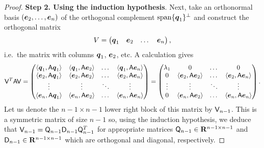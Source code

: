 \begin{proof}
            \vspace{.3cm}
            \textbf{Step 2. Using the induction hypothesis}.
            Next,
            take an orthonormal basis $(\mathbf{\boldsymbol{e}}_2, \dotsc, \mathbf{\boldsymbol{e}}_n)$ of the orthogonal complement $\operatorname{span}\{\mathbf{\boldsymbol{q}}_1\}^\perp$
            and construct the orthogonal matrix
            \[
                V = \begin{pmatrix} \mathbf{\boldsymbol{q}}_1 & \mathbf{\boldsymbol{e}}_2 & \dots & \mathbf{\boldsymbol{e}}_n \end{pmatrix},
            \]
            i.e.\ the matrix with columns $\mathbf{\boldsymbol{q}}_1$, $\mathbf{\boldsymbol{e}}_2$, etc.
            A calculation gives
            \[
                \mathsf V^T \mathsf A \mathsf V =
                \begin{pmatrix}
                    \langle\mathbf{\boldsymbol{q}}_1, \mathsf A \mathbf{\boldsymbol{q}}_1\rangle & \langle\mathbf{\boldsymbol{q}}_1, \mathsf A \mathbf{\boldsymbol{e}}_2\rangle & \dots & \langle\mathbf{\boldsymbol{q}}_1, \mathsf A \mathbf{\boldsymbol{e}}_n\rangle \\
                    \langle\mathbf{\boldsymbol{e}}_2, \mathsf A \mathbf{\boldsymbol{q}}_1\rangle & \langle\mathbf{\boldsymbol{e}}_2, \mathsf A \mathbf{\boldsymbol{e}}_2\rangle & \dots & \langle\mathbf{\boldsymbol{e}}_2, \mathsf A \mathbf{\boldsymbol{e}}_n\rangle \\
                    \vdots & \vdots & \ddots & \vdots \\
                    \langle\mathbf{\boldsymbol{e}}_n, \mathsf A \mathbf{\boldsymbol{q}}_1\rangle & \langle\mathbf{\boldsymbol{e}}_n, \mathsf A \mathbf{\boldsymbol{e}}_2\rangle & \dots & \langle\mathbf{\boldsymbol{e}}_n, \mathsf A \mathbf{\boldsymbol{e}}_n\rangle
                \end{pmatrix}
                =
                \begin{pmatrix}
                    \lambda_1 & 0 & \dots & 0 \\
                    0 & \langle\mathbf{\boldsymbol{e}}_2, \mathsf A \mathbf{\boldsymbol{e}}_2\rangle & \dots & \langle\mathbf{\boldsymbol{e}}_2, \mathsf A \mathbf{\boldsymbol{e}}_n\rangle \\
                    \vdots & \vdots & \ddots & \vdots \\
                    0 & \langle\mathbf{\boldsymbol{e}}_n, \mathsf A \mathbf{\boldsymbol{e}}_2\rangle & \dots & \langle\mathbf{\boldsymbol{e}}_n, \mathsf A \mathbf{\boldsymbol{e}}_n\rangle
                \end{pmatrix}.
            \]
            Let us denote the $n-1 \times n-1$ lower right block of this matrix by $\mathsf V_{n-1}$.
            This is a symmetric matrix of size $n-1$ so,
            using the induction hypothesis,
            we deduce that $\mathsf V_{n-1} = \mathsf Q_{n-1} \mathsf D_{n-1} \mathsf Q_{n-1}^T$
            for appropriate matrices $\mathsf Q_{n-1} \in \mathbf R^{n-1 \times n-1}$ and $\mathsf D_{n-1} \in \mathbf R^{n-1 \times n-1}$
            which are orthogonal and diagonal, respectively.


\end{proof}
